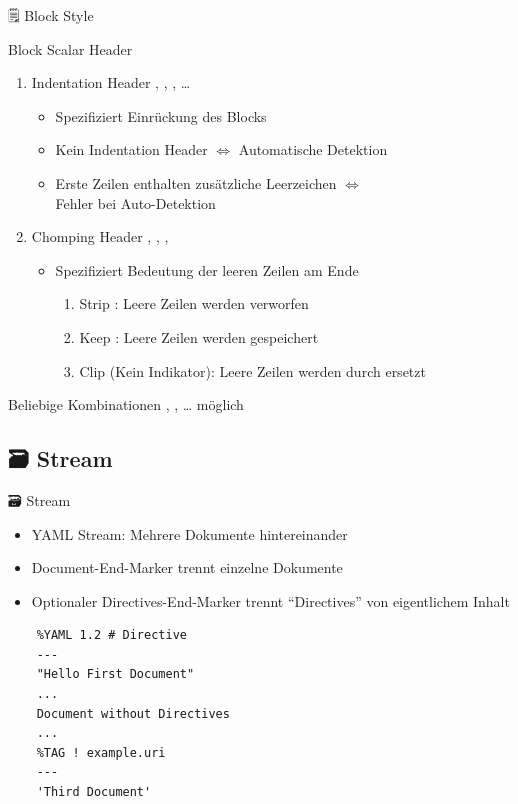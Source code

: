 \documentclass{beamer}
\newcommand{\code}[1]{
  \codebox{\texttt|#1|}
}
\begin{document}
\begin{frame}{🗒 Block Style}
  \newpage
  \begin{block}{Block Scalar Header}
    \begin{enumerate}
      \item Indentation Header , \code{>2}, \code{>5}, …
      \begin{itemize}
        \item Spezifiziert Einrückung des Blocks
        \item Kein Indentation Header $⇔$ Automatische Detektion
        \item Erste Zeilen enthalten zusätzliche Leerzeichen $⇔$ \\
              \alert{Fehler bei Auto-Detektion}
      \end{itemize}
      \item Chomping Header \codebox{\texttt{|-}}, \codebox{\texttt{|+}}, \code{>-}, \code{>+}
      \begin{itemize}
        \item Spezifiziert Bedeutung der leeren Zeilen \alert{am Ende}
        \begin{enumerate}
          \item Strip \code{-}: Leere Zeilen werden verworfen
          \item Keep \code{+}: Leere Zeilen werden gespeichert
          \item Clip (Kein Indikator): Leere Zeilen werden durch \code{\n} ersetzt
        \end{enumerate}
      \end{itemize}
    \end{enumerate}
    Beliebige Kombinationen , \code{>4+}, … möglich
  \end{block}

\end{frame}

\subsection{🗃 Stream}

\begin{frame}[fragile]{🗃 Stream}
  \begin{itemize}
    \item YAML Stream: Mehrere Dokumente hintereinander
    \item Document-End-Marker \code{...} trennt einzelne Dokumente
    \item Optionaler Directives-End-Marker \code{---} trennt “Directives” von eigentlichem Inhalt
  \end{itemize}
  \begin{verbatim}
    %YAML 1.2 # Directive
    ---
    "Hello First Document"
    ...
    Document without Directives
    ...
    %TAG ! example.uri
    ---
    'Third Document'
  \end{verbatim}
\end{frame}
\end{document}

